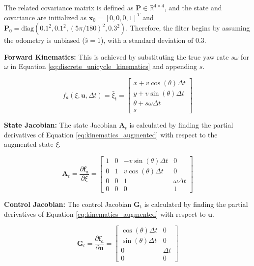 The related covariance matrix is defined as $\textbf{P}\in\mathbb{R}^{4\times4}$, and the state and covariance are initialized as $\textbf{x}_0=[0,0,0,1]^T$ and $\textbf{P}_0=\text{diag}(0.1^2, 0.1^2, (5\pi/180)^2, 0.3^2)$.
Therefore, the filter begins by assuming the odometry is unbiased ($\widehat{s}=1$), with a standard deviation of 0.3.

\textbf{Forward Kinematics:} This is achieved by substituting the true yaw rate $s\omega$ for $\omega$ in Equation \ref{eq:discrete_unicycle_kinematics} and appending $s$.

\begin{equation}\label{eq:kinematics_augmented}
    f_a(\xi,\textbf{u},\Delta t) = \bar{\xi}_t = \begin{bmatrix}
        x + v \cos(\theta) \Delta t \\ y + v \sin(\theta) \Delta t \\ \theta + s\omega \Delta t \\ s
    \end{bmatrix}
\end{equation}

\textbf{State Jacobian:} The state Jacobian $\textbf{A}_t$ is calculated by finding the partial derivatives of Equation \ref{eq:kinematics_augmented} with respect to the augmented state $\xi$.

\begin{equation}\label{eq:state_jacobian_augmented}
    \textbf{A}_t = \frac{\partial \textbf{f}_a}{\partial \xi} = 
    \begin{bmatrix} 
        1 & 0 & -v \sin(\theta) \Delta t & 0 \\
        0 & 1 &  v \cos(\theta) \Delta t & 0 \\
        0 & 0 & 1                        & \omega \Delta t \\
        0 & 0 & 0                        & 1
    \end{bmatrix}
\end{equation}

\textbf{Control Jacobian:} The control Jacobian $\textbf{G}_t$ is calculated by finding the partial derivatives of Equation \ref{eq:kinematics_augmented} with respect to $\textbf{u}$.

\begin{equation}\label{eq:control_jacobian_augmented}
    \textbf{G}_t = \frac{\partial \textbf{f}_a}{\partial \textbf{u}} = 
    \begin{bmatrix} 
        \cos(\theta) \Delta t & 0  \\
        \sin(\theta) \Delta t & 0  \\
        0 & \Delta t \\
        0 & 0
    \end{bmatrix}
\end{equation}

